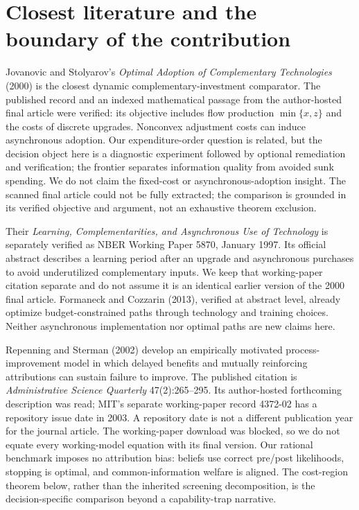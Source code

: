 \documentclass[11pt]{article}
\begin{document}
\section{Closest literature and the boundary of the contribution}
Jovanovic and Stolyarov's \emph{Optimal Adoption of Complementary Technologies} (2000) is the closest dynamic complementary-investment comparator. The published record and an indexed mathematical passage from the author-hosted final article were verified: its objective includes flow production $\min\{x,z\}$ and the costs of discrete upgrades. Nonconvex adjustment costs can induce asynchronous adoption. Our expenditure-order question is related, but the decision object here is a diagnostic experiment followed by optional remediation and verification; the frontier separates information quality from avoided sunk spending. We do not claim the fixed-cost or asynchronous-adoption insight. The scanned final article could not be fully extracted; the comparison is grounded in its verified objective and argument, not an exhaustive theorem exclusion.

Their \emph{Learning, Complementarities, and Asynchronous Use of Technology} is separately verified as NBER Working Paper 5870, January 1997. Its official abstract describes a learning period after an upgrade and asynchronous purchases to avoid underutilized complementary inputs. We keep that working-paper citation separate and do not assume it is an identical earlier version of the 2000 final article. Formaneck and Cozzarin (2013), verified at abstract level, already optimize budget-constrained paths through technology and training choices. Neither asynchronous implementation nor optimal paths are new claims here.

Repenning and Sterman (2002) develop an empirically motivated process-improvement model in which delayed benefits and mutually reinforcing attributions can sustain failure to improve. The published citation is \emph{Administrative Science Quarterly} 47(2):265--295. Its author-hosted forthcoming description was read; MIT's separate working-paper record 4372-02 has a repository issue date in 2003. A repository date is not a different publication year for the journal article. The working-paper download was blocked, so we do not equate every working-model equation with its final version. Our rational benchmark imposes no attribution bias: beliefs use correct pre/post likelihoods, stopping is optimal, and common-information welfare is aligned. The cost-region theorem below, rather than the inherited screening decomposition, is the decision-specific comparison beyond a capability-trap narrative.
\end{document}
